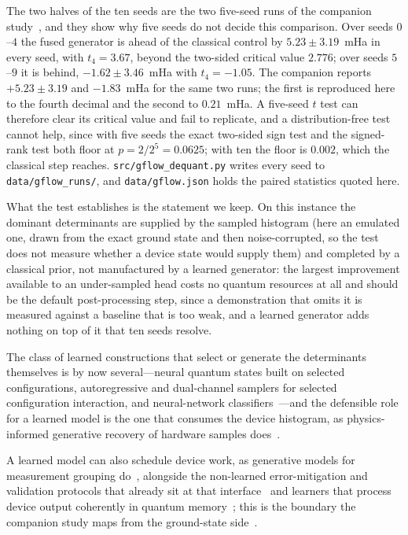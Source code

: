 The two halves of the ten seeds are the two five-seed runs of the companion
study~\cite{review}, and they show why five seeds do not decide this comparison. Over seeds
$0$--$4$ the fused generator is ahead of the classical control by $5.23\pm3.19$~mHa in
every seed, with $t_4=3.67$, beyond the two-sided critical value $2.776$; over seeds $5$--$9$
it is behind, $-1.62\pm3.46$~mHa with $t_4=-1.05$. The companion reports
$+5.23\pm3.19$ and $-1.83$~mHa for the same two runs; the first is reproduced here to the
fourth decimal and the second to $0.21$~mHa. A five-seed $t$ test can therefore clear its critical
value and fail to replicate, and a distribution-free test cannot help, since with five seeds the
exact two-sided sign test and the signed-rank test both floor at $p=2/2^{5}=0.0625$; with ten the
floor is $0.002$, which the classical step reaches. \texttt{src/gflow\_dequant.py} writes every seed
to \texttt{data/gflow\_runs/}, and \texttt{data/gflow.json} holds the paired statistics quoted here.

What the test establishes is the statement we keep. On this instance the dominant determinants are
supplied by the sampled histogram (here an emulated one, drawn from the exact ground state and then
noise-corrupted, so the test does not measure whether a device state would supply them) and completed
by a classical prior, not manufactured by a learned generator: the largest improvement available to an under-sampled head costs no quantum resources at
all and should be the default post-processing step, since a demonstration that omits it is measured
against a baseline that is too weak, and a learned generator adds nothing on top of it that ten
seeds resolve.

The class of learned constructions that select or generate the determinants
themselves is by now several---neural quantum states built on selected configurations,
autoregressive and dual-channel samplers for selected configuration interaction, and neural-network
classifiers~\cite{nqssc2026,arnnsci2026,hinqs2026,zeni2026}---and the defensible role for a learned
model is the one that consumes the device histogram, as physics-informed generative recovery of
hardware samples does~\cite{pigensqd}.

A learned model can also schedule device work, as generative models for
measurement grouping do~\cite{vargashernandez2024,vargashernandez2025}, alongside the non-learned
error-mitigation and validation protocols that already sit at that
interface~\cite{qesem2025,algorithmiq2026} and learners that process device output coherently in
quantum memory~\cite{huang2022}; this is the boundary the companion study maps from the
ground-state side~\cite{review}.
